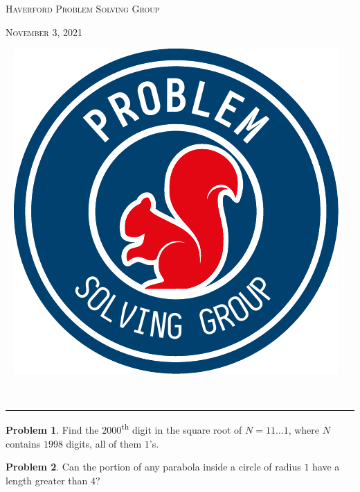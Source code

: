 \documentclass{scrartcl}
\theoremstyle{definition}
\newtheorem{prob}{Problem}
\begin{document}
	\begin{minipage}{.6\textwidth}{}
		\textsc{Haverford Problem Solving Group}

		\textsc{November 3, 2021}
	\end{minipage}
	\begin{minipage}{.4\textwidth}{}
		\ \hfill
		\includegraphics[height = .9in]{psg_logo}
	\end{minipage}\\[1em]

	\hrule

	\setcounter{prob}{2}
	\begin{prob}
		Find the $2000$\textsuperscript{th} digit in the square root of $N = 11\dots1$, where $N$ contains $1998$ digits, all of them $1$'s.
	\end{prob}

	\setcounter{prob}{5}
	\begin{prob}
		Can the portion of any parabola inside a circle of radius \(1\) have a length greater than \(4\)?
	\end{prob}

	\setcounter{prob}{9}
\end{document}
